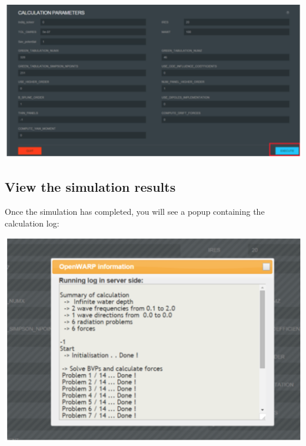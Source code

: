 \documentclass[12pt]{article}
\begin{document}
\vspace{\abovedisplayskip}
\begin{minipage}{\linewidth}
	\centering
	\includegraphics[scale=0.4]{img/29}
\end{minipage}
\vspace{\belowdisplayskip}




\subsection{View the simulation results}
Once the simulation has completed, you will see a popup containing the calculation log:

\vspace{\abovedisplayskip}
\begin{minipage}{\linewidth}
	\centering
	\includegraphics[scale=0.4]{img/30}
\end{minipage}
\vspace{\belowdisplayskip}
\end{document}
